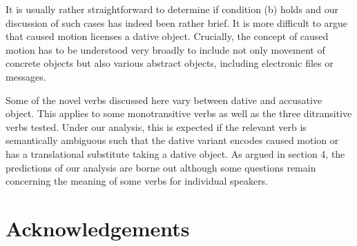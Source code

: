 It is usually rather straightforward to determine if condition (b) holds and our discussion of such cases has indeed been rather brief. It is more difficult to argue that caused motion licenses a dative object. Crucially, the concept of caused motion has to be understood very broadly to include not only movement of concrete objects but also various abstract objects, including electronic files or messages. 

Some of the novel verbs discussed here vary between dative and accusative object. This applies to some monotransitive verbs as well as the three ditransitive verbs tested. Under our analysis, this is expected if the relevant verb is semantically ambiguous such that the dative variant encodes caused motion or has a translational substitute taking a dative object. As argued in section 4, the predictions of our analysis are borne out although some questions remain concerning the meaning of some verbs for individual speakers. 

\section{Acknowledgements}

